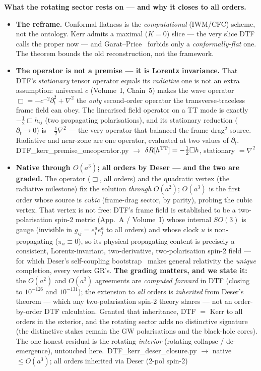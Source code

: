 \documentclass[11pt]{article}
\newcommand{\pychip}[2]{{\footnotesize\colorbox{cbPyBg}{\ttfamily\,#1\,}\,{\color{gray}$\to$ #2}}}
\begin{document}
\begin{tcolorbox}
\textbf{What the rotating sector rests on --- and why it closes to all orders.}
\begin{itemize}[leftmargin=1.5em,itemsep=3pt,topsep=3pt]
  \item \textbf{The reframe.} Conformal flatness is the \emph{computational} (IWM/CFC) scheme, not the
    ontology. Kerr admits a maximal ($K=0$) slice --- the very slice DTF calls the proper now ---
    and Garat--Price~\cite{GaratPrice2000} forbids only a \emph{conformally-flat} one. The theorem bounds
    the old reconstruction, not the framework.
  \item \textbf{The operator is not a premise --- it is Lorentz invariance.} That DTF's \emph{stationary}
    tensor operator equals its \emph{radiative} one is not an extra assumption: universal $c$ (Volume~I,
    Chain~5) makes the wave operator $\Box=-c^{-2}\partial_t^2+\nabla^2$ the \emph{only} second-order
    operator the transverse-traceless frame field can obey. The linearised field operator on a TT mode is
    exactly $-\tfrac12\Box h_{ij}$ (two propagating polarisations), and its stationary reduction
    ($\partial_t\!\to\!0$) is $-\tfrac12\nabla^2$ --- the very operator that balanced the frame-drag$^2$
    source. Radiative and near-zone are one operator, evaluated at two values of $\partial_t$.
    \pychip{DTF\_kerr\_premise\_oneoperator.py}{$\delta R[h^{\rm TT}]=-\tfrac12\Box h$, stationary $=\nabla^2$}
  \item \textbf{Native through $O(a^3)$; all orders by Deser --- and the two are graded.} The operator
    ($\Box$, all orders) and the quadratic vertex (the radiative milestone) fix the solution \emph{through}
    $O(a^2)$; $O(a^3)$ is the first order whose source is \emph{cubic} (frame-drag sector, by parity), probing
    the cubic vertex. That vertex is not free: DTF's frame field is established to be a two-polarisation
    spin-2 metric (App.~A / Volume~I) whose internal $SO(3)$ is gauge (invisible in $g_{ij}=e^a_ie^a_j$ to all
    orders) and whose clock $u$ is non-propagating ($\pi_u\equiv0$), so its physical propagating content is
    precisely a consistent, Lorentz-invariant, two-derivative, two-polarisation spin-2 field --- for which
    Deser's self-coupling bootstrap~\cite{Deser1970} makes general relativity the \emph{unique} completion,
    every vertex GR's. \textbf{The grading matters, and we state it:} the $O(a^2)$ and $O(a^3)$ agreements are
    \emph{computed forward} in DTF (closing to $10^{-126}$ and $10^{-131}$); the extension to \emph{all}
    orders is \emph{inherited} from Deser's theorem --- which any two-polarisation spin-2 theory shares ---
    not an order-by-order DTF calculation. Granted that inheritance, DTF $=$ Kerr to all orders in the
    exterior, and the rotating sector adds no distinctive signature (the distinctive stakes remain the GW
    polarisations and the black-hole cores). The one honest residual is the rotating \emph{interior}
    (rotating collapse / de-emergence), untouched here.
    \pychip{DTF\_kerr\_deser\_closure.py}{native $\le O(a^3)$; all orders inherited via Deser (2-pol spin-2)}
\end{itemize}
\end{tcolorbox}
\end{document}
